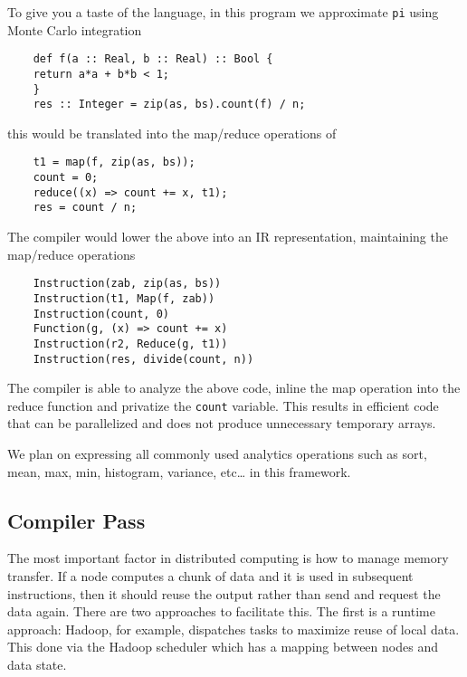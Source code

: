 To give you a taste of the language, in this program we approximate
\texttt{pi} using Monte Carlo integration

\begin{verbatim}
    def f(a :: Real, b :: Real) :: Bool {
    return a*a + b*b < 1;
    }
    res :: Integer = zip(as, bs).count(f) / n;
\end{verbatim}

this would be translated into the map/reduce operations of

\begin{verbatim}
    t1 = map(f, zip(as, bs));
    count = 0;
    reduce((x) => count += x, t1);
    res = count / n;
\end{verbatim}

The compiler would lower the above into an IR representation,
maintaining the map/reduce operations

\begin{verbatim}
    Instruction(zab, zip(as, bs))
    Instruction(t1, Map(f, zab))
    Instruction(count, 0)
    Function(g, (x) => count += x)
    Instruction(r2, Reduce(g, t1))
    Instruction(res, divide(count, n))
\end{verbatim}

The compiler is able to analyze the above code, inline the map operation
into the reduce function and privatize the \texttt{count} variable. This
results in efficient code that can be parallelized and does not produce
unnecessary temporary arrays.

We plan on expressing all commonly used analytics operations such as
sort, mean, max, min, histogram, variance, etc\ldots{} in this
framework.

\subsection{Compiler Pass}

The most important factor in distributed computing is how to manage
memory transfer. If a node computes a chunk of data and it is used in
subsequent instructions, then it should reuse the output rather than
send and request the data again. There are two approaches to facilitate
this. The first is a runtime approach: Hadoop, for example, dispatches
tasks to maximize reuse of local data. This done via the Hadoop
scheduler which has a mapping between nodes and data state.

